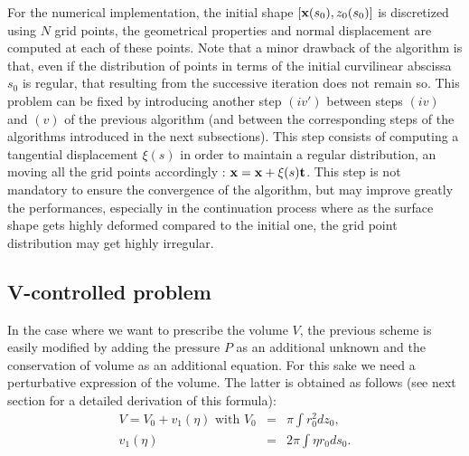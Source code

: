 \documentclass{jfm}
\newcommand\be{\begin{equation}}
\newcommand\ee{\end{equation}}
\begin{document}
For the numerical implementation, the initial shape $[{\bf x}(s_0), z_0(s_0)]$ is discretized using $N$ grid points, 
the geometrical properties and normal displacement are computed at each of these points. 
Note that a minor drawback of the algorithm is that, even if the distribution of points in terms of the initial curvilinear abscissa $s_0$
is regular, that resulting from the successive iteration does not remain so. This problem can be fixed by introducing another step $(iv')$ between steps $(iv)$ and $(v)$ of the previous algorithm (and between the corresponding steps of the algorithms introduced in the next subsections). This step consists of computing a tangential displacement $\xi(s)$ in order to maintain a regular distribution, an moving all the grid points accordingly : ${\bf x} = {\bf x} + \xi(s) \bf t$. This step is not mandatory to ensure the convergence of the algorithm, but may improve greatly the performances, especially in the continuation process where as the surface shape gets highly deformed compared to the initial one, the grid point distribution may get highly irregular.




\subsection{V-controlled problem}

In the case where we want to prescribe the volume $V$, the previous scheme is easily modified by adding the pressure $P$ as an additional unknown and the conservation of volume as an additional equation. For this sake we need a perturbative expression of the volume. The latter is obtained as follows (see next section for a detailed derivation of this formula):
\be
\begin{array}{rcl}
V = V_0 + v_1(\eta)  \mbox{ with }  
V_0 &= & 
\displaystyle \pi \int r_0^2 dz_0,  \\
v_1(\eta) &=&  2 \pi \int \eta  r_0  ds_0. \\ 
\end{array}
\label{eq:V01}
\ee
\end{document}
